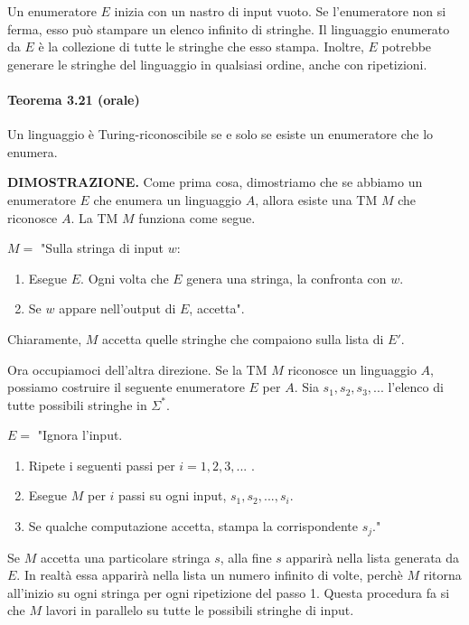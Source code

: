 \documentclass{article}
\begin{document}
Un enumeratore $E$ inizia con un nastro di input vuoto. Se l'enumeratore non si ferma, esso può stampare un elenco infinito di stringhe.
Il linguaggio enumerato da $E$ è la collezione di tutte le stringhe che esso stampa.
Inoltre, $E$ potrebbe generare le stringhe del linguaggio in qualsiasi ordine, anche con ripetizioni.
\newpage
\paragraph{Teorema 3.21 (orale)}
\label{th:da MdT a enumerator}
\text{ }

\begin{tcolorbox}[colback=red!10!white, colframe=red!50!black, title=Teorema 3.21 orale]
    Un linguaggio è Turing-riconoscibile se e solo se esiste un enumeratore che lo enumera.
\end{tcolorbox}

\textbf{DIMOSTRAZIONE.}
Come prima cosa, dimostriamo che se abbiamo un enumeratore $E$ che enumera un linguaggio $A$, allora esiste una TM $M$ che riconosce $A$.
La TM $M$ funziona come segue.
\vspace{1em}

$M = $ "Sulla stringa di input $w$:
\begin{enumerate}
    \item Esegue $E$. Ogni volta che $E$ genera una stringa, la confronta con $w$.
    \item Se $w$ appare nell'output di $E$, accetta".
\end{enumerate}

Chiaramente, $M$ accetta quelle stringhe che compaiono sulla lista di $E'$.

Ora occupiamoci dell'altra direzione.
Se la TM $M$ riconosce un linguaggio $A$, possiamo costruire il seguente enumeratore $E$ per $A$.
Sia $s_1,s_2,s_3,...$ l'elenco di tutte possibili stringhe in $\Sigma^*$.
\vspace{1em}

$E = $ "Ignora l'input.
\begin{enumerate}
    \item Ripete i seguenti passi per $i = 1,2,3,...$ .
    \item Esegue $M$ per $i$ passi su ogni input, $s_1,s_2,...,s_i$.
    \item Se qualche computazione accetta, stampa la corrispondente $s_j$."
\end{enumerate}

Se $M$ accetta una particolare stringa $s$, alla fine $s$ apparirà nella lista generata da $E$.
In realtà essa apparirà nella lista un numero infinito di volte, perchè $M$ ritorna all'inizio su ogni stringa per ogni ripetizione del passo 1.
Questa procedura fa si che $M$ lavori in parallelo su tutte le possibili stringhe di input.
\end{document}
